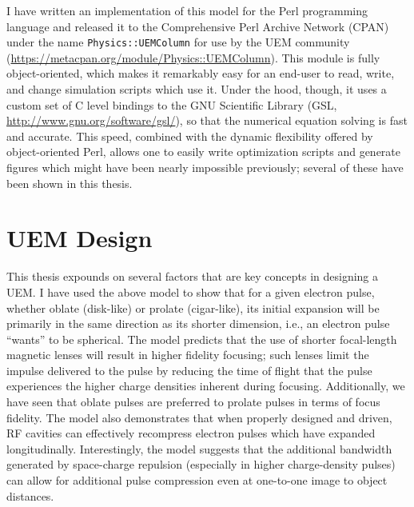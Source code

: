 I have written an implementation of this model for the Perl programming language and released it to the Comprehensive Perl Archive Network (CPAN) under the name \verb!Physics::UEMColumn! for use by the UEM community (\url{https://metacpan.org/module/Physics::UEMColumn}).
This module is fully object-oriented, which makes it remarkably easy for an end-user to read, write, and change simulation scripts which use it.
Under the hood, though, it uses a custom set of C level bindings to the GNU Scientific Library (GSL, \url{http://www.gnu.org/software/gsl/}), so that the numerical equation solving is fast and accurate.
This speed, combined with the dynamic flexibility offered by object-oriented Perl, allows one to easily write optimization scripts and generate figures which might have been nearly impossible previously; several of these have been shown in this thesis.

\section{UEM Design}

This thesis expounds on several factors that are key concepts in designing a UEM.
I have used the above model to show that for a given electron pulse, whether oblate (disk-like) or prolate (cigar-like), its initial expansion will be primarily in the same direction as its shorter dimension, i.e., an electron pulse ``wants'' to be spherical.
The model predicts that the use of shorter focal-length magnetic lenses will result in higher fidelity focusing; such lenses limit the impulse delivered to the pulse by reducing the time of flight that the pulse experiences the higher charge densities inherent during focusing.
Additionally, we have seen that oblate pulses are preferred to prolate pulses in terms of focus fidelity.
The model also demonstrates that when properly designed and driven, RF cavities can effectively recompress electron pulses which have expanded longitudinally.
Interestingly, the model suggests that the additional bandwidth generated by space-charge repulsion (especially in higher charge-density pulses) can allow for additional pulse compression even at one-to-one image to object distances.

